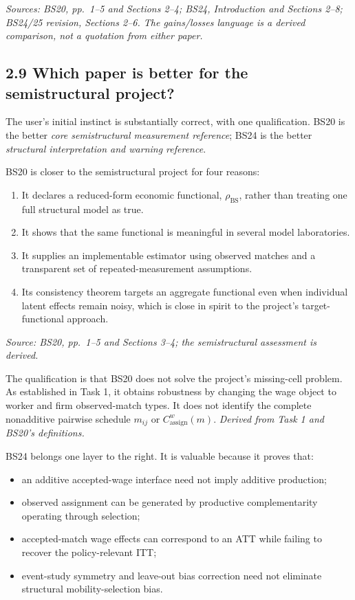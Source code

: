 \documentclass[11pt]{article}
\begin{document}
\textit{Sources: BS20, pp.\ 1--5 and Sections 2--4; BS24, Introduction and
Sections 2--8; BS24/25 revision, Sections 2--6.  The gains/losses language is a
derived comparison, not a quotation from either paper.}

\subsection{2.9 Which paper is better for the semistructural project?}

The user's initial instinct is substantially correct, with one qualification.
BS20 is the better \emph{core semistructural measurement reference}; BS24 is
the better \emph{structural interpretation and warning reference}.

BS20 is closer to the semistructural project for four reasons:

\begin{enumerate}
\item It declares a reduced-form economic functional,
  \(\rho_{\mathrm{BS}}\), rather than treating one full structural model as
  true.
\item It shows that the same functional is meaningful in several model
  laboratories.
\item It supplies an implementable estimator using observed matches and a
  transparent set of repeated-measurement assumptions.
\item Its consistency theorem targets an aggregate functional even when
  individual latent effects remain noisy, which is close in spirit to the
  project's target-functional approach.
\end{enumerate}

\textit{Source: BS20, pp.\ 1--5 and Sections 3--4; the semistructural
assessment is derived.}

The qualification is that BS20 does not solve the project's missing-cell
problem.  As established in Task 1, it obtains robustness by changing the wage
object to worker and firm observed-match types.  It does not identify the
complete nonadditive pairwise schedule \(m_{ij}\) or
\(C^w_{\mathrm{assign}}(m)\).
\textit{Derived from Task 1 and BS20's definitions.}

BS24 belongs one layer to the right.  It is valuable because it proves that:

\begin{itemize}
\item an additive accepted-wage interface need not imply additive production;
\item observed assignment can be generated by productive complementarity
  operating through selection;
\item accepted-match wage effects can correspond to an ATT while failing to
  recover the policy-relevant ITT;
\item event-study symmetry and leave-out bias correction need not eliminate
  structural mobility-selection bias.
\end{itemize}
\end{document}
